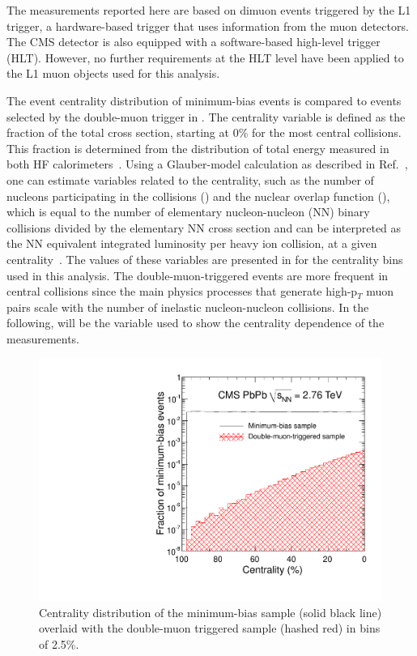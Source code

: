 The measurements reported here are based on dimuon events triggered by
the L1 trigger, a hardware-based trigger that uses information
from the muon detectors. The CMS detector is also equipped with a
software-based high-level trigger (HLT). However, no further
requirements at the HLT level have been applied to the L1 muon objects
used for this analysis.

The event centrality distribution of minimum-bias events is compared
to events selected by the double-muon trigger in
. The centrality variable is defined as the
fraction of the total cross section, starting at 0\% for the most
central collisions. This fraction is determined from the distribution
of total energy measured in both HF
calorimeters~\cite{Chatrchyan:2011pb}. Using a Glauber-model
calculation as described in Ref.~\cite{Chatrchyan:2011sx}, one can
estimate variables related to the centrality, such as the number of
nucleons participating in the collisions (\npart) and the nuclear
overlap function (\taa), which is equal to the number of elementary
nucleon-nucleon (NN) binary collisions divided by the elementary NN
cross section and can be interpreted as the NN equivalent integrated
luminosity per heavy ion collision, at a given
centrality~\cite{Miller:2007ri}. The values of these variables are
presented in  for the centrality bins used in this
analysis. The double-muon-triggered events are more frequent in
central collisions since the main physics processes that generate
high-p$_T$ muon pairs scale with the number of inelastic nucleon-nucleon
collisions. In the following, \npart will be the variable used to show
the centrality dependence of the measurements.

\begin{figure}[hbtp]
  \begin{center}
   \includegraphics[width=0.5\linewidth]{chap_YInPbPbColl2010_figures/centralityDoubleMuOpen}
   \caption{Centrality distribution of the minimum-bias sample (solid
     black line) overlaid with the double-muon triggered sample
     (hashed red) in bins of 2.5\%.}
   \label{fig:centrality}
  \end{center}
\end{figure}




